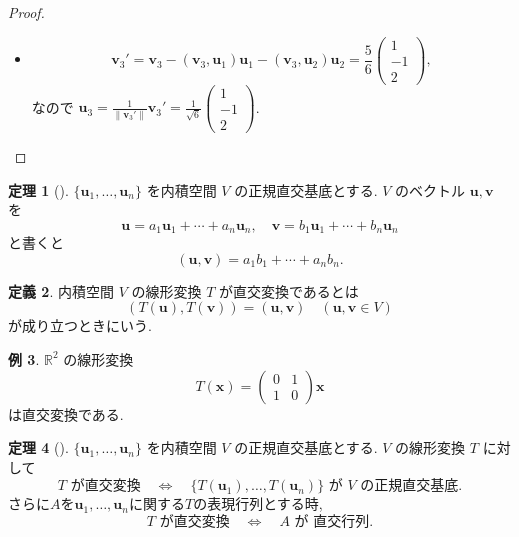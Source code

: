 \documentclass[dvipdfmx,a4paper,11pt]{article} %
\theoremstyle{definition}
\newtheorem{thm}{定理}[section]
\newtheorem{defn}[thm]{定義}
\newtheorem{eg}[thm]{例}
\begin{document}
\begin{proof}
\begin{itemize}
\[\begin{pmatrix}
1\\
1
\end{pmatrix}
\]
なので
\(
\bm{u}_2
=
\frac{1}{\lVert \bm{v}_2'\rVert}\bm{v}_2'
=
\frac{1}{\sqrt{3}}
\begin{pmatrix}
-1\\
1\\
1
\end{pmatrix}.
\)
\item 
\[
\bm{v}_3'
=
\bm{v}_3-(\bm{v}_3,\bm{u}_1)\bm{u}_1-(\bm{v}_3,\bm{u}_2)\bm{u}_2
=
\frac{5}{6}
\begin{pmatrix}
1\\
-1\\
2
\end{pmatrix},
\]
なので
\(
\bm{u}_3
=
\frac{1}{\lVert \bm{v}_3'\rVert}\bm{v}_3'
=
\frac{1}{\sqrt{6}}
\begin{pmatrix}
1\\
-1\\
2
\end{pmatrix}
\).
\end{itemize}
\end{proof}


\begin{thm}
[{\cite[定理6.2.2]{M}}]
\(\{\bm{u}_1,\ldots,\bm{u}_n\}\) を内積空間 \(V\) の正規直交基底とする. \(V\) のベクトル \(\bm{u},\bm{v}\) を
\[
\bm{u}=a_1\bm{u}_1+\cdots+a_n\bm{u}_n,\quad
\bm{v}=b_1\bm{u}_1+\cdots+b_n\bm{u}_n
\]
と書くと
\[
(\bm{u},\bm{v})=a_1b_1+\cdots+a_nb_n.
\]
\end{thm}


\begin{defn}
内積空間 \(V\) の線形変換 \(T\) が直交変換であるとは
\[
(T(\bm{u}),T(\bm{v}))=(\bm{u},\bm{v})
\quad (\bm{u},\bm{v}\in V)
\]
が成り立つときにいう.
\end{defn}

\begin{eg}
\(\mathbb{R}^2\) の線形変換
\[
T(\bm{x})=
\begin{pmatrix}
0&1\\
1&0
\end{pmatrix}\bm{x}
\]
は直交変換である.
\end{eg}

\begin{thm}
[{\cite[定理6.2.3, 定理6.2.4]{M}}]
\(\{\bm{u}_1,\ldots,\bm{u}_n\}\) を内積空間 \(V\) の正規直交基底とする. \(V\) の線形変換 \(T\) に対して
\[
T\text{ が直交変換}
\quad\Longleftrightarrow\quad
\{T(\bm{u}_1),\ldots,T(\bm{u}_n)\}\text{ が \(V\) の正規直交基底}.
\]
さらに$A$を$\bm{u}_1, \ldots, \bm{u}_n$に関する$T$の表現行列とする時, 
$$
T\text{ が直交変換}
\quad\Longleftrightarrow\quad
A\text{ が 直交行列}.
$$
\end{thm}
\end{document}
